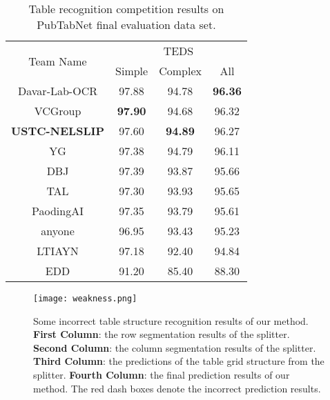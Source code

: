 \documentclass[review]{elsarticle}
\begin{document}
\begin{table}[!htp]
	\centering
	\renewcommand\arraystretch{.9}
	\setlength{\tabcolsep}{4mm}
	
	\caption{Table recognition competition results on PubTabNet final evaluation data set.}
	\label{pubtabnet-competition}
	\begin{tabular}{|c|c|c|c|}
		\hline
		\multirow{2}{*}{Team Name} & \multicolumn{3}{c|}{TEDS}                        \\ \cline{2-4} 
		& Simple         & Complex        & All            \\ \hline
		Davar-Lab-OCR              & 97.88          & 94.78          & \textbf{96.36} \\ \hline
		VCGroup                    & \textbf{97.90} & 94.68          & 96.32          \\ \hline
		\textbf{USTC-NELSLIP}      & 97.60          & \textbf{94.89} & 96.27          \\ \hline
		YG                         & 97.38          & 94.79          & 96.11          \\ \hline
		DBJ                        & 97.39          & 93.87          & 95.66          \\ \hline
		TAL                        & 97.30          & 93.93          & 95.65          \\ \hline
		PaodingAI                  & 97.35          & 93.79          & 95.61          \\ \hline
		anyone                     & 96.95          & 93.43          & 95.23          \\ \hline
		LTIAYN                     & 97.18          & 92.40          & 94.84          \\ \hline
		EDD						   & 91.20  & 85.40  & 88.30 \\ \hline
	\end{tabular}
\end{table}

\begin{figure*}[!htb]
	\centerline{\texttt{[image: weakness.png]}}
	\caption{Some incorrect table structure recognition results of our method. \textbf{First Column}: the row segmentation results of the splitter. \textbf{Second Column}: the column segmentation results of the splitter. \textbf{Third Column}: the predictions of the table grid structure from the splitter. \textbf{Fourth Column}: the final prediction results of our method. The red dash boxes denote the incorrect prediction results.}
	\label{error_analysis}
\end{figure*}
\end{document}

